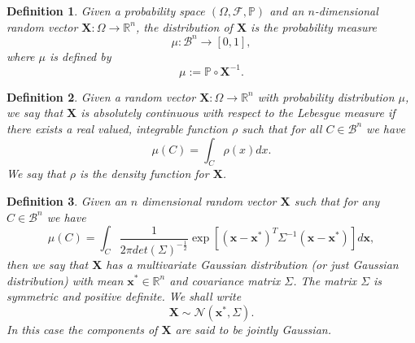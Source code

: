 \documentclass[12pt]{book}
\newtheorem{definition}{Definition}
\newcommand{\p}{\mathbb{P}}
\begin{document}
\begin{definition}
Given a probability space $(\Omega,\mathscr{F},\p)$ and an $n$-dimensional  random vector 
$\mathbf{X}:\Omega\rightarrow\mathbb{R}^{n}$, the distribution of $\mathbf{X}$
is the probability measure
\begin{equation*}
\mu:\mathcal{B}^{n}\rightarrow [0,1],
\end{equation*}
where  $\mu$ is defined by 
\begin{equation*}
\mu:=\p\circ \textbf{X}^{-1}.
\end{equation*}
\end{definition}
\begin{definition}
Given a random vector $\textbf{X}:\Omega\rightarrow\mathbb{R}^{n}$ with
probability distribution $\mu$, we say that $\mathbf{X}$ is absolutely 
continuous with respect to the Lebesgue measure if there exists a real valued, integrable function $\rho$
such that for all $C\in\mathcal{B}^{n}$ we have
\begin{equation*}
\mu(C)=\int_{C}\rho(x)dx.
\end{equation*}
We say that $\rho$ is the density function for $\mathbf{X}$.
\end{definition}
\begin{definition}\label{dfnrandonvariables}
Given an $n$ dimensional random vector $\mathbf{X}$ such that for any 
$C\in\mathcal{B}^{n}$ we have
\begin{equation}\label{eqnmultivariateGaussianDefinition}
\mu(C)=\int_{C}
\frac{1}{2\pi det(\Sigma)^{-\frac{1}{2}}}\exp\left[(\textbf{x}-\textbf{x}^{*})^{T}\Sigma^{-1}
(\textbf{x}-\textbf{x}^{*})\right]d\textbf{x},
\end{equation}
then we say
that $\textbf{X}$ has a multivariate Gaussian distribution (or just Gaussian distribution) 
with mean $\textbf{x}^{*}\in\mathbb{R}^{n}$
and covariance matrix $\Sigma$. The matrix $\Sigma$ is symmetric and positive definite. We shall write
\begin{equation}\label{eqnMultivariate}
\textbf{X}\sim \mathcal{N}(\textbf{x}^{*},\Sigma).
\end{equation}
In this case the components of $\textbf{X}$ are said to be \textit{jointly Gaussian}.
\end{definition}
\end{document}
